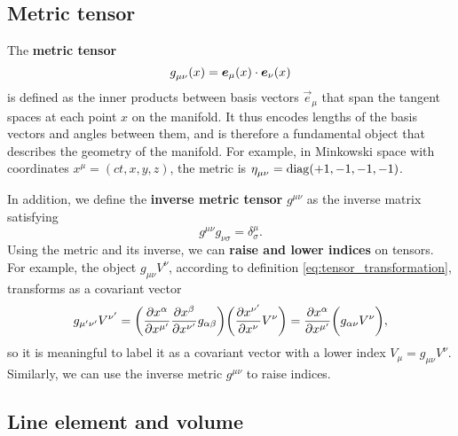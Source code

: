 \subsection{Metric tensor}

The \textbf{metric tensor}
\begin{equation}
	g\indices{_\mu_\nu}(x) = \vec{e}_\mu(x) \cdot \vec{e}_\nu(x)
\label{eq:def_metric}
\end{equation}
is defined as the inner products between basis vectors $\vec{e}_\mu$ that span the tangent spaces at each point $x$ on the manifold.
It thus encodes lengths of the basis vectors and angles between them, and is therefore a fundamental object that describes the geometry of the manifold.
For example, in Minkowski space with coordinates $x^\mu = (ct, x, y, z)$, the metric is $\eta\indices{_\mu_\nu} = \diag (+1, -1, -1, -1)$.

In addition, we define the \textbf{inverse metric tensor} $g^{\mu \nu}$ as the inverse matrix satisfying
\begin{equation}
	g^{\mu \nu} g_{\nu \sigma} = \delta^\mu_\sigma .
\end{equation}
Using the metric and its inverse, we can \textbf{raise and lower indices} on tensors.
For example, the object $g_{\mu \nu} V^\nu$, according to definition \eqref{eq:tensor_transformation}, transforms as a covariant vector
\begin{equation}
	g_{\mu' \nu'} V^{\nu'} = \bigg( \pdv{x^{\alpha}}{x^{\mu'}} \pdv{x^{\beta}}{x^{\nu'}} g_{\alpha \beta} \bigg) \bigg( \pdv{x^{\nu'}}{x^{\nu}} V^{\nu} \bigg) = \pdv{x^{\alpha}}{x^{\mu'}} \bigg( g_{\alpha \nu} V^\nu \bigg) ,
\end{equation}
so it is meaningful to label it as a covariant vector with a lower index $V_\mu = g_{\mu \nu} V^\nu$.
Similarly, we can use the inverse metric $g^{\mu \nu}$ to raise indices.

\subsection{Line element and volume}

